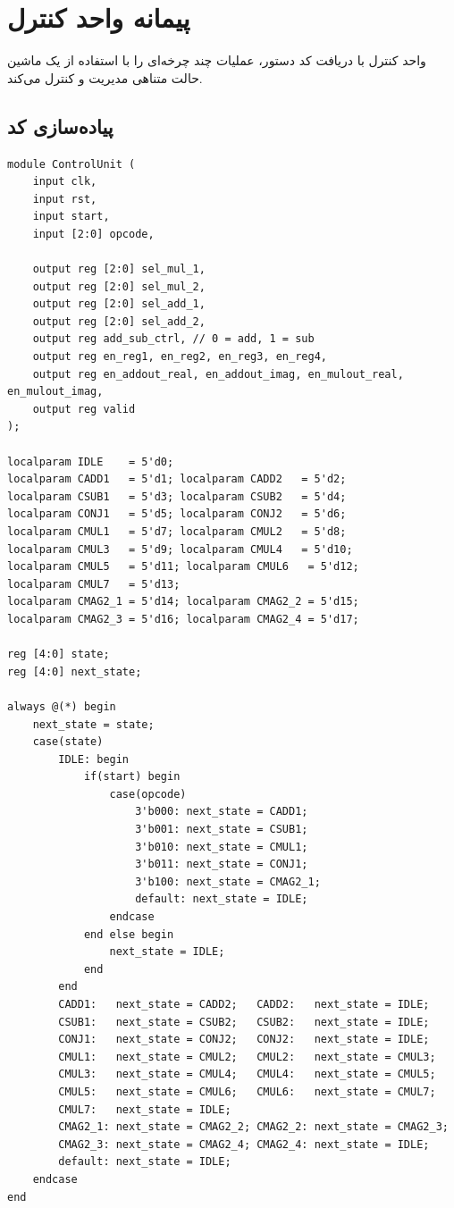 \documentclass[11pt,a4paper]{article}
\begin{document}
\section{پیمانه واحد کنترل}
واحد کنترل با دریافت کد دستور، عملیات چند چرخه‌ای را با استفاده از یک ماشین حالت متناهی مدیریت و کنترل می‌کند.

\subsection{پیاده‌سازی کد}
\begin{LTR}
\begin{lstlisting}[title={\rl{کد پیمانه واحد کنترل}}]
module ControlUnit (
    input clk,
    input rst,
    input start,
    input [2:0] opcode,

    output reg [2:0] sel_mul_1,
    output reg [2:0] sel_mul_2,
    output reg [2:0] sel_add_1,
    output reg [2:0] sel_add_2,
    output reg add_sub_ctrl, // 0 = add, 1 = sub
    output reg en_reg1, en_reg2, en_reg3, en_reg4,
    output reg en_addout_real, en_addout_imag, en_mulout_real, en_mulout_imag,
    output reg valid
);

localparam IDLE    = 5'd0;
localparam CADD1   = 5'd1; localparam CADD2   = 5'd2;
localparam CSUB1   = 5'd3; localparam CSUB2   = 5'd4;
localparam CONJ1   = 5'd5; localparam CONJ2   = 5'd6;
localparam CMUL1   = 5'd7; localparam CMUL2   = 5'd8;
localparam CMUL3   = 5'd9; localparam CMUL4   = 5'd10;
localparam CMUL5   = 5'd11; localparam CMUL6   = 5'd12;
localparam CMUL7   = 5'd13;
localparam CMAG2_1 = 5'd14; localparam CMAG2_2 = 5'd15;
localparam CMAG2_3 = 5'd16; localparam CMAG2_4 = 5'd17;

reg [4:0] state;
reg [4:0] next_state;

always @(*) begin
    next_state = state; 
    case(state)
        IDLE: begin
            if(start) begin
                case(opcode)
                    3'b000: next_state = CADD1;
                    3'b001: next_state = CSUB1;
                    3'b010: next_state = CMUL1;
                    3'b011: next_state = CONJ1;
                    3'b100: next_state = CMAG2_1;
                    default: next_state = IDLE;
                endcase
            end else begin
                next_state = IDLE;
            end
        end
        CADD1:   next_state = CADD2;   CADD2:   next_state = IDLE;
        CSUB1:   next_state = CSUB2;   CSUB2:   next_state = IDLE;
        CONJ1:   next_state = CONJ2;   CONJ2:   next_state = IDLE;
        CMUL1:   next_state = CMUL2;   CMUL2:   next_state = CMUL3;
        CMUL3:   next_state = CMUL4;   CMUL4:   next_state = CMUL5;
        CMUL5:   next_state = CMUL6;   CMUL6:   next_state = CMUL7;
        CMUL7:   next_state = IDLE;
        CMAG2_1: next_state = CMAG2_2; CMAG2_2: next_state = CMAG2_3;
        CMAG2_3: next_state = CMAG2_4; CMAG2_4: next_state = IDLE;
        default: next_state = IDLE;
    endcase
end


\end{lstlisting}
\end{LTR}
\end{document}
